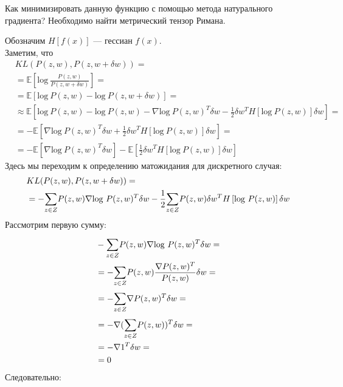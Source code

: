 \documentclass[a4paper,12pt]{article}
\begin{document}
Как минимизировать данную функцию с помощью метода натурального градиента? Необходимо найти метрический тензор Римана.

Обозначим $H\left[f(x)\right]$ --- гессиан $f(x)$. \\
Заметим, что
$$
\begin{aligned}
    & KL(P(z, w), P(z, w + \delta w)) = \\
    & = \mathbb{E} \left[ \mbox{log} ~ \frac{P(z, w)}{P(z, w + \delta w)} \right] = \\
    & = \mathbb{E} \left[ \mbox{log} ~ P(z, w) - \mbox{log} ~ P(z, w + \delta w) \right] = \\
    & \approx \mathbb{E} \left[ \mbox{log} ~ P(z, w) - \mbox{log} ~ P(z, w) - \nabla \mbox{log} ~ P(z, w)^T \delta w - \frac{1}{2} \delta w^T H\left[\mbox{log} ~ P(z, w)\right] \delta w \right] = \\
    & = \mathbb{-E} \left[ \nabla \mbox{log} ~ P(z, w)^T \delta w + \frac{1}{2} \delta w^T H\left[\mbox{log} ~ P(z, w)\right] \delta w \right] = \\
    & = \mathbb{-E} \left[ \nabla \mbox{log} ~ P(z, w)^T \delta w \right] - \mathbb{E} \left[ \frac{1}{2} \delta w^T H\left[\mbox{log} ~ P(z, w)\right] \delta w \right]
\end{aligned}
$$
Здесь мы переходим к определению матожидания для дискретного случая:
$$
\begin{aligned}
    & KL(P(z, w), P(z, w + \delta w)) = \\
    & = -\overset{}{\underset{z \in Z}{\sum}}{P}(z, w) \nabla \mbox{log} ~ P(z, w)^T \delta w -\frac{1}{2} \overset{}{\underset{z \in Z}{\sum}}{P}(z, w) \delta w^T H\left[\mbox{log} ~ P(z, w) \right] \delta w \\
\end{aligned}
$$
Рассмотрим первую сумму:
$$
\begin{aligned}
    & -\overset{}{\underset{z \in Z}{\sum}}{P}(z, w) \nabla \mbox{log} ~ P(z, w)^T \delta w = \\
    & = -\overset{}{\underset{z \in Z}{\sum}}{P}(z, w) \frac{\nabla P(z, w)^T}{P(z, w)} \delta w = \\
    & = -\overset{}{\underset{z \in Z}{\sum}}{\nabla} P(z, w)^T \delta w = \\
    & = -\nabla (\overset{}{\underset{z \in Z}{\sum}}{P}(z, w))^T \delta w = \\
    & = -\nabla 1^T \delta w = \\
    & = 0
\end{aligned}
$$
Следовательно: 
\end{document}
